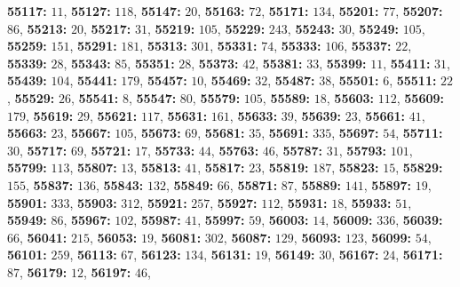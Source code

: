 \textsf{\bfseries 55117:} $11$, \textsf{\bfseries 55127:} $118$, \textsf{\bfseries 55147:} $20$, \textsf{\bfseries 55163:} $72$, \textsf{\bfseries 55171:} $134$, \textsf{\bfseries 55201:} $77$, \textsf{\bfseries 55207:} $86$, \textsf{\bfseries 55213:} $20$, \textsf{\bfseries 55217:} $31$, \textsf{\bfseries 55219:} $105$, \textsf{\bfseries 55229:} $243$, \textsf{\bfseries 55243:} $30$, \textsf{\bfseries 55249:} $105$, \textsf{\bfseries 55259:} $151$, \textsf{\bfseries 55291:} $181$, \textsf{\bfseries 55313:} $301$, \textsf{\bfseries 55331:} $74$, \textsf{\bfseries 55333:} $106$, \textsf{\bfseries 55337:} $22$, \textsf{\bfseries 55339:} $28$, \textsf{\bfseries 55343:} $85$, \textsf{\bfseries 55351:} $28$, \textsf{\bfseries 55373:} $42$, \textsf{\bfseries 55381:} $33$, \textsf{\bfseries 55399:} $11$, \textsf{\bfseries 55411:} $31$, \textsf{\bfseries 55439:} $104$, \textsf{\bfseries 55441:} $179$, \textsf{\bfseries 55457:} $10$, \textsf{\bfseries 55469:} $32$, \textsf{\bfseries 55487:} $38$, \textsf{\bfseries 55501:} $6$, \textsf{\bfseries 55511:} $22$, \textsf{\bfseries 55529:} $26$, \textsf{\bfseries 55541:} $8$, \textsf{\bfseries 55547:} $80$, \textsf{\bfseries 55579:} $105$, \textsf{\bfseries 55589:} $18$, \textsf{\bfseries 55603:} $112$, \textsf{\bfseries 55609:} $179$, \textsf{\bfseries 55619:} $29$, \textsf{\bfseries 55621:} $117$, \textsf{\bfseries 55631:} $161$, \textsf{\bfseries 55633:} $39$, \textsf{\bfseries 55639:} $23$, \textsf{\bfseries 55661:} $41$, \textsf{\bfseries 55663:} $23$, \textsf{\bfseries 55667:} $105$, \textsf{\bfseries 55673:} $69$, \textsf{\bfseries 55681:} $35$, \textsf{\bfseries 55691:} $335$, \textsf{\bfseries 55697:} $54$, \textsf{\bfseries 55711:} $30$, \textsf{\bfseries 55717:} $69$, \textsf{\bfseries 55721:} $17$, \textsf{\bfseries 55733:} $44$, \textsf{\bfseries 55763:} $46$, \textsf{\bfseries 55787:} $31$, \textsf{\bfseries 55793:} $101$, \textsf{\bfseries 55799:} $113$, \textsf{\bfseries 55807:} $13$, \textsf{\bfseries 55813:} $41$, \textsf{\bfseries 55817:} $23$, \textsf{\bfseries 55819:} $187$, \textsf{\bfseries 55823:} $15$, \textsf{\bfseries 55829:} $155$, \textsf{\bfseries 55837:} $136$, \textsf{\bfseries 55843:} $132$, \textsf{\bfseries 55849:} $66$, \textsf{\bfseries 55871:} $87$, \textsf{\bfseries 55889:} $141$, \textsf{\bfseries 55897:} $19$, \textsf{\bfseries 55901:} $333$, \textsf{\bfseries 55903:} $312$, \textsf{\bfseries 55921:} $257$, \textsf{\bfseries 55927:} $112$, \textsf{\bfseries 55931:} $18$, \textsf{\bfseries 55933:} $51$, \textsf{\bfseries 55949:} $86$, \textsf{\bfseries 55967:} $102$, \textsf{\bfseries 55987:} $41$, \textsf{\bfseries 55997:} $59$, \textsf{\bfseries 56003:} $14$, \textsf{\bfseries 56009:} $336$, \textsf{\bfseries 56039:} $66$, \textsf{\bfseries 56041:} $215$, \textsf{\bfseries 56053:} $19$, \textsf{\bfseries 56081:} $302$, \textsf{\bfseries 56087:} $129$, \textsf{\bfseries 56093:} $123$, \textsf{\bfseries 56099:} $54$, \textsf{\bfseries 56101:} $259$, \textsf{\bfseries 56113:} $67$, \textsf{\bfseries 56123:} $134$, \textsf{\bfseries 56131:} $19$, \textsf{\bfseries 56149:} $30$, \textsf{\bfseries 56167:} $24$, \textsf{\bfseries 56171:} $87$, \textsf{\bfseries 56179:} $12$, \textsf{\bfseries 56197:} $46$, 
